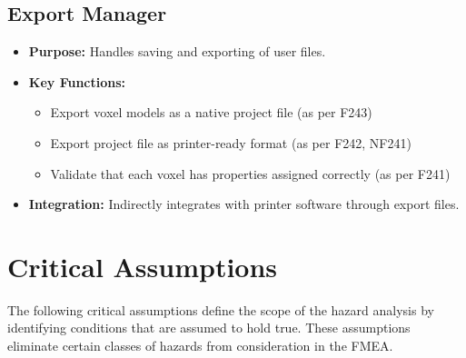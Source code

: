 \documentclass{article}
\begin{document}
\subsection{Export Manager}
\begin{itemize}
    \item \textbf{Purpose:} Handles saving and exporting of user files.
    \item \textbf{Key Functions:} 
    \begin{itemize}
        \item Export voxel models as a native project file (as per F243)
        \item Export project file as printer-ready format (as per F242, NF241)
        \item Validate that each voxel has properties assigned correctly (as per F241)
    \end{itemize}
    \item \textbf{Integration:} Indirectly integrates with printer software through export files.
\end{itemize}


\section{Critical Assumptions}

The following critical assumptions define the scope of the hazard analysis by identifying conditions that are assumed to hold true. These assumptions eliminate certain classes of hazards from consideration in the FMEA.
\end{document}
